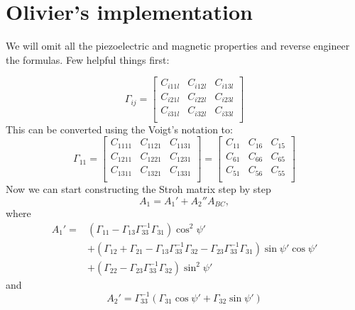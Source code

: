 \documentclass[12pt,a4paper]{article}
\begin{document}
\section{Olivier's implementation}
We will omit all the piezoelectric and magnetic properties and reverse engineer the formulas. Few helpful things first:

\begin{equation}
\label{eq:GammaMatrix}
\Gamma_{ij}= 
\begin{bmatrix}
C_{i11l} & C_{i12l} & C_{i13l} \\
C_{i21l} & C_{i22l} & C_{i23l} \\
C_{i31l} & C_{i32l} & C_{i33l} \\
\end{bmatrix} 
\end{equation}
This can be converted using the Voigt's notation to:
\begin{equation}
\label{eq:GammaMatrixVoigt}
\Gamma_{11}=
\begin{bmatrix}
C_{1111} & C_{1121} & C_{1131} \\
C_{1211} & C_{1221} & C_{1231} \\
C_{1311} & C_{1321} & C_{1331} \\
\end{bmatrix}=  
\begin{bmatrix}
C_{11} & C_{16} & C_{15} \\
C_{61} & C_{66} & C_{65} \\
C_{51} & C_{56} & C_{55} \\
\end{bmatrix} 
\end{equation} 
Now we can start constructing the Stroh matrix step by step
\begin{equation}
\label{eq:A1}
A_1 = A_1'+A_2''A_{BC},  
\end{equation}
where
\begin{align}
\label{eq:A1prime}
	A_1' = &(\Gamma_{11}-\Gamma_{13}\Gamma_{33}^{-1}\Gamma_{31})\cos^2{\psi'} \nonumber\\ &+(\Gamma_{12}+\Gamma_{21}-\Gamma_{13}\Gamma_{33}^{-1}\Gamma_{32}-\Gamma_{23}\Gamma_{33}^{-1}\Gamma_{31})\sin{\psi'}\cos{\psi'} \nonumber\\
	&+(\Gamma_{22}-\Gamma_{23}\Gamma_{33}^{-1}\Gamma_{32})\sin^2{\psi'}
\end{align}
and 
\begin{equation}
\label{eq:A2prime}
A_2' =\Gamma_{33}^{-1}(\Gamma_{31} \cos{\psi'} + \Gamma_{32} \sin{\psi'})  
\end{equation}
\end{document}
